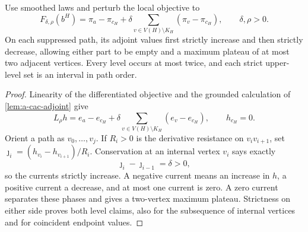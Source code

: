 \begin{lemma}
\label{lem:a-blk-unimodal}
Use smoothed laws and perturb the local objective to
\[
 F_{\delta,\rho}(b^H)=\pi_a-\pi_{c_H}
       +\delta\sum_{v\in V(H)\setminus K_H}(\pi_v-\pi_{c_H}),\qquad \delta,\rho>0.
\]
On each suppressed path, its adjoint values first strictly increase
and then strictly decrease, allowing either part to be empty and a
maximum plateau of at most two adjacent vertices. Every level occurs
at most twice, and each strict upper-level set is an interval in path
order.
\end{lemma}
\begin{proof}
Linearity of the differentiated objective and the grounded calculation
of \cref{lem:a-cac-adjoint} give
\[
 L_\rho h=e_a-e_{c_H}
       +\delta\sum_{v\in V(H)\setminus K_H}(e_v-e_{c_H}),\qquad h_{c_H}=0.
\]
Orient a path as $v_0,\ldots,v_j$. If $R_i>0$ is the derivative
resistance on $v_iv_{i+1}$, set
$\jmath_i=(h_{v_i}-h_{v_{i+1}})/R_i$. Conservation at an internal
vertex $v_i$ says exactly
\[
 \jmath_i-\jmath_{i-1}=\delta>0,
\]
so the currents strictly increase. A negative current means an
increase in $h$, a positive current a decrease, and at most one current
is zero. A zero current separates these phases and gives a two-vertex
maximum plateau. Strictness on either side proves both level claims,
also for the subsequence of internal vertices and for coincident
endpoint values.
\end{proof}

